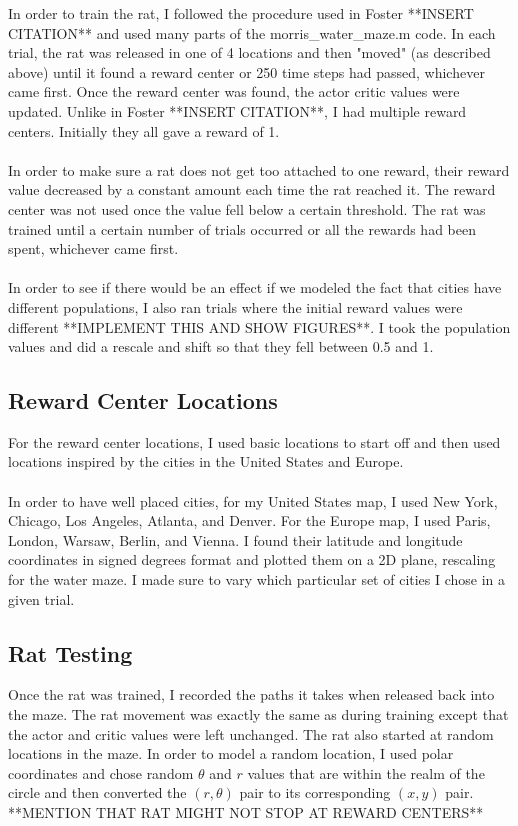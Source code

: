 \documentclass[conference]{IEEEtran}
\begin{document}
In order to train the rat, I followed the procedure used in Foster **INSERT CITATION** and used many parts of the morris\_water\_maze.m code. In each trial, the rat was released in one of 4 locations and then "moved" (as described above) until it found a reward center or 250 time steps had passed, whichever came first. Once the reward center was found, the actor critic values were updated. Unlike in Foster **INSERT CITATION**, I had multiple reward centers. Initially they all gave a reward of 1.\\
\\
In order to make sure a rat does not get too attached to one reward, their reward value decreased by a constant amount each time the rat reached it. The reward center was not used once the value fell below a certain threshold. The rat was trained until a certain number of trials occurred or all the rewards had been spent, whichever came first. \\
\\
In order to see if there would be an effect if we modeled the fact that cities have different populations, I also ran trials where the initial reward values were different **IMPLEMENT THIS AND SHOW FIGURES**. I took the population values and did a rescale and shift so that they fell between 0.5 and 1. 

\subsection{Reward Center Locations}
For the reward center locations, I used basic locations to start off and then used locations inspired by the cities in the United States and Europe. \\
\\
In order to have well placed cities, for my United States map, I used New York, Chicago, Los Angeles, Atlanta, and Denver. For the Europe map, I used Paris, London, Warsaw, Berlin, and Vienna. I found their latitude and longitude coordinates in signed degrees format and plotted them on a 2D plane, rescaling for the water maze. I made sure to vary which particular set of cities I chose in a given trial. 

\subsection{Rat Testing}

Once the rat was trained, I recorded the paths it takes when released back into the maze. The rat movement was exactly the same as during training except that the actor and critic values were left unchanged. The rat also started at random locations in the maze. In order to model a random location, I used polar coordinates and chose random $\theta$ and $r$ values that are within the realm of the circle and then converted the $(r,\theta)$ pair to its corresponding $(x,y)$ pair. 
**MENTION THAT RAT MIGHT NOT STOP AT REWARD CENTERS**
\end{document}
